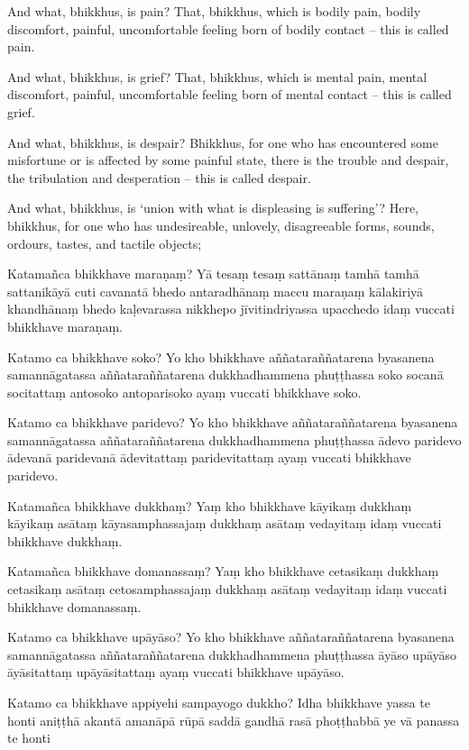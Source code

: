 And what, bhikkhus, is pain? That, bhikkhus, which is bodily pain, bodily
discomfort, painful, uncomfortable feeling born of bodily contact -- this is
called pain.

And what, bhikkhus, is grief? That, bhikkhus, which is mental pain, mental
discomfort, painful, uncomfortable feeling born of mental contact -- this is
called grief.

And what, bhikkhus, is despair? Bhikkhus, for one who has encountered some
misfortune or is affected by some painful state, there is the trouble and
despair, the tribulation and desperation -- this is called despair.

And what, bhikkhus, is `union with what is displeasing is suffering'? Here,
bhikkhus, for one who has undesireable, unlovely, disagreeable forms, sounds,
ordours, tastes, and tactile objects;

\paliPage

Katamañca bhikkhave maraṇaṃ? Yā tesaṃ tesaṃ sattānaṃ tamhā tamhā sattanikāyā
cuti cavanatā bhedo antaradhānaṃ maccu maraṇaṃ kālakiriyā khandhānaṃ bhedo
kaḷevarassa nikkhepo jīvitindriyassa upacchedo idaṃ vuccati bhikkhave maraṇaṃ.

Katamo ca bhikkhave soko? Yo kho bhikkhave aññataraññatarena byasanena
samannāgatassa aññataraññatarena dukkhadhammena phuṭṭhassa soko socanā
socitattaṃ antosoko antoparisoko ayaṃ vuccati bhikkhave soko.

Katamo ca bhikkhave paridevo? Yo kho bhikkhave aññataraññatarena byasanena
samannāgatassa aññataraññatarena dukkhadhammena phuṭṭhassa ādevo paridevo
ādevanā paridevanā ādevitattaṃ paridevitattaṃ ayaṃ vuccati bhikkhave paridevo.

Katamañca bhikkhave dukkhaṃ? Yaṃ kho bhikkhave kāyikaṃ dukkhaṃ kāyikaṃ asātaṃ
kāyasamphassajaṃ dukkhaṃ asātaṃ vedayitaṃ idaṃ vuccati bhikkhave dukkhaṃ.

Katamañca bhikkhave domanassaṃ? Yaṃ kho bhikkhave cetasikaṃ dukkhaṃ cetasikaṃ
asātaṃ cetosamphassajaṃ dukkhaṃ asātaṃ vedayitaṃ idaṃ vuccati bhikkhave
domanassaṃ.

Katamo ca bhikkhave upāyāso? Yo kho bhikkhave aññataraññatarena byasanena
samannāgatassa aññataraññatarena dukkhadhammena phuṭṭhassa āyāso upāyāso
āyāsitattaṃ upāyāsitattaṃ ayaṃ vuccati bhikkhave upāyāso.

Katamo ca bhikkhave appiyehi sampayogo dukkho? Idha bhikkhave yassa te honti
aniṭṭhā akantā amanāpā rūpā saddā gandhā rasā phoṭṭhabbā ye vā panassa te honti

\englishPage

